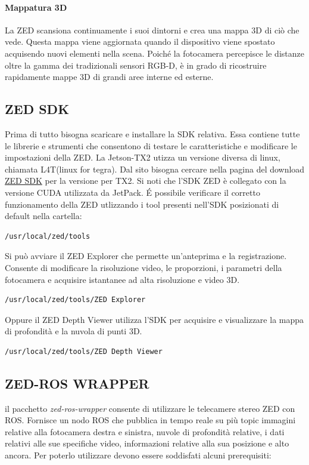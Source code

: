 \documentclass[a4paper]{article}
\begin{document}
\paragraph{Mappatura 3D}
La ZED scansiona continuamente i suoi dintorni e crea una mappa 3D di ciò che vede. Questa mappa viene aggiornata quando il dispositivo viene spostato acquisendo nuovi elementi nella scena. Poiché la fotocamera percepisce le distanze oltre la gamma dei tradizionali sensori RGB-D, è in grado di ricostruire rapidamente mappe 3D di grandi aree interne ed esterne.

\subsection{ZED SDK}
Prima di tutto bisogna scaricare e installare la SDK relativa. Essa contiene tutte le librerie e strumenti che  consentono di testare le caratteristiche e modificare le impostazioni della ZED.
La Jetson-TX2 utizza un versione diversa di linux, chiamata L4T(linux for tegra). Dal sito bisogna cercare nella pagina del download 
 \href{https://www.stereolabs.com/developers/release/#sdkdownloads_anchor}{ZED SDK} per la versione per TX2. 
Si noti che l'SDK ZED è collegato con la versione CUDA utilizzata da JetPack.
\'E possibile verificare il corretto funzionamento della ZED utlizzando i tool presenti nell'SDK posizionati di default nella cartella:
\begin{verbatim}
/usr/local/zed/tools
\end{verbatim}
Si può avviare il ZED Explorer che permette un'anteprima e la registrazione. Consente di modificare la risoluzione video, le proporzioni, i parametri della fotocamera e acquisire istantanee ad alta risoluzione e video 3D.
\begin{verbatim}
/usr/local/zed/tools/ZED Explorer
\end{verbatim}
Oppure il ZED Depth Viewer utilizza l'SDK per acquisire e visualizzare la mappa di profondità e la nuvola di punti 3D.
\begin{verbatim}
/usr/local/zed/tools/ZED Depth Viewer
\end{verbatim}
\newpage
\subsection{ZED-ROS WRAPPER}

il pacchetto \textit{zed-ros-wrapper} consente di utilizzare le telecamere stereo ZED con ROS. 
Fornisce un nodo ROS che pubblica in tempo reale su più topic immagini relative alla fotocamera destra e sinistra, nuvole di profondità relative, i dati relativi alle sue specifiche video, informazioni relative alla sua posizione e alto ancora.
Per poterlo utilizzare devono essere soddisfati alcuni prerequisiti:
\end{document}

